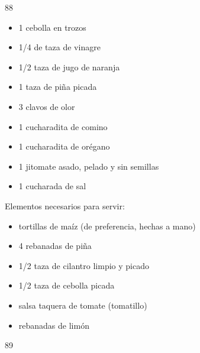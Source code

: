 \documentclass[12pt,twoside,openright,a5paper]{book}
\begin{document}
\vspace{0.5cm}

\hrulefill \hspace{0.1cm}\decofourleft\hspace{0.2cm} 88 \hspace{0.2cm}\decofourright \hspace{0.1cm}\hrulefill

\nopagebreak

\vspace{0.5cm}

\nopagebreak

\begin{itemize}

\item 1 cebolla en trozos
\item 1/4 de taza de vinagre
\item 1/2 taza de jugo de naranja
\item 1 taza de piña picada
\item 3 clavos de olor
\item 1 cucharadita de comino
\item 1 cucharadita de orégano
\item 1 jitomate asado, pelado y sin semillas
\item 1 cucharada de sal

\end {itemize}

Elementos necesarios para servir:

\begin{itemize} 

\item tortillas de maíz (de preferencia, hechas a mano)
\item 4 rebanadas de piña
\item 1/2 taza de cilantro limpio y picado
\item 1/2 taza de cebolla picada
\item salsa taquera de tomate (tomatillo)
\item rebanadas de limón

\end{itemize}


\vspace{0.5cm}

\hrulefill \hspace{0.1cm}\decofourleft\hspace{0.2cm} 89 \hspace{0.2cm}\decofourright \hspace{0.1cm}\hrulefill
\end{document}
